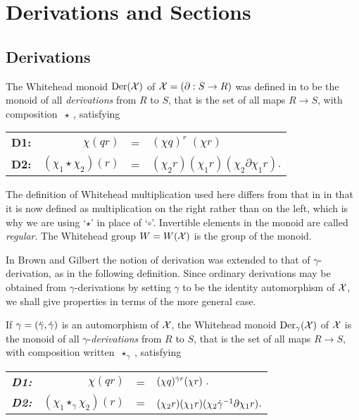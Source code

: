 
\section{Derivations and Sections} \label{sect:der-sec}


\subsection{Derivations} \label{subsec:der} 

The Whitehead monoid  $\mathrm{Der}(\mathcal{X})$  of  
$\mathcal{X} = (\partial : S \to R)$ was defined in \cite{W-48b} 
to be the monoid of all {\it derivations} from $R$ to $S$, 
that is the set of all maps  $R \to S$, with composition  $\ \star \ $, satisfying
\begin{center}
\begin{tabular}{c r c l }
\textbf{D1:}  &  $\chi(qr)$              &  = 
           & $(\chi q)^{r} \; (\chi r)$  \\
\textbf{D2:}  &  $(\chi_1 \star \chi_2)(r)$  &  =
           & $(\chi_2 r)(\chi_1 r)(\chi_2 \partial \chi_1 r)$. 
\end{tabular}
\end{center}

\noindent
The definition of Whitehead multiplication used here 
differs from that in \cite{alp:wens-ijac} in that it is now 
defined as multiplication on the right rather than on the left, 
which is why we are using `$\star$' in place of `$\circ$'. 
Invertible elements in the monoid are called \emph{regular}. 
  
The Whitehead group $W = W(\mathcal{X})$ is the group of the monoid. 

In Brown and Gilbert \cite{brow:gilb} the notion of derivation 
was extended to that of $\gamma$-derivation, as in the following definition. 
Since ordinary derivations may be obtained from $\gamma$-derivations 
by setting $\gamma$ to be the identity automorphism of $\mathcal{X}$, 
we shall give properties in terms of the more general case. 

\begin{defn} 
If $\gamma = (\ddot{\gamma},\dot{\gamma})$ is an automorphism of $\mathcal{X}$,
the Whitehead monoid $\mathrm{Der}_{\gamma}(\mathcal{X})$  of  $\mathcal{X}$ 
is the monoid of all $\gamma$-{\it derivations}
from $R$ to $S$, that is the set of all maps  $R \to S$,
with composition written  $\ \star_{\gamma} \ $, satisfying
\begin{center}
\begin{tabular}{c r c l }
\textbf{\emph{D1:}}  &  $\chi(qr)$              &  = 
           & $(\chi q)^{\dot{\gamma} r}(\chi r)~.$  \\
\textbf{\emph{D2:}}  &  $(\chi_1 \star_{\gamma} \chi_2)(r)$  &  =
           & $(\chi_2 r)(\chi_1 r)(\chi_2 \dot{\gamma}^{-1} \partial \chi_1 r)$. 
\end{tabular}
\end{center}
\end{defn}

